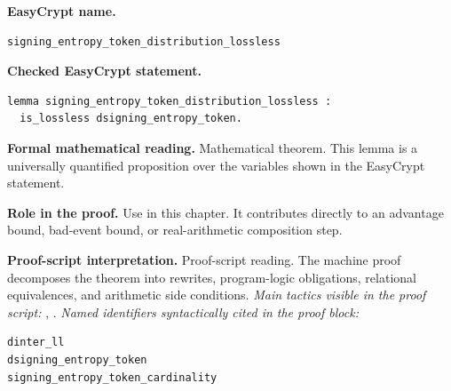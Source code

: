 \begin{formaltheorem}
\noindent\textbf{EasyCrypt name.}
\begin{lstlisting}[language=EasyCrypt,basicstyle=\ttfamily\scriptsize]
signing_entropy_token_distribution_lossless
\end{lstlisting}
\noindent\textbf{Checked EasyCrypt statement.}
\begin{lstlisting}[language=EasyCrypt,basicstyle=\ttfamily\scriptsize]
lemma signing_entropy_token_distribution_lossless :
  is_lossless dsigning_entropy_token.
\end{lstlisting}
\noindent\textbf{Formal mathematical reading.}
Mathematical theorem. This lemma is a universally quantified proposition over the variables shown in the EasyCrypt statement.

\noindent\textbf{Role in the proof.}
Use in this chapter. It contributes directly to an advantage bound, bad-event bound, or real-arithmetic composition step.

\noindent\textbf{Proof-script interpretation.}
Proof-script reading. The machine proof decomposes the theorem into rewrites, program-logic obligations, relational equivalences, and arithmetic side conditions.
\emph{Main tactics visible in the proof script:} , .
\emph{Named identifiers syntactically cited in the proof block:}
\begin{lstlisting}[language=EasyCrypt,basicstyle=\ttfamily\scriptsize]
dinter_ll
dsigning_entropy_token
signing_entropy_token_cardinality
\end{lstlisting}

\end{formaltheorem}

